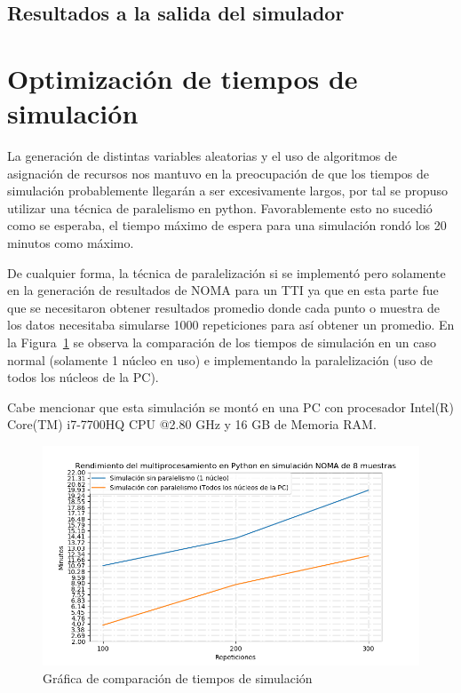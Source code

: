 \subsection{Resultados a la salida del simulador}

\hfill

\break


\section{Optimización de tiempos de simulación}

La generación de distintas variables aleatorias y el uso de algoritmos de asignación de recursos nos mantuvo en la preocupación de que los tiempos de simulación probablemente llegarán a ser excesivamente largos, por tal se propuso utilizar una técnica de paralelismo en python. Favorablemente esto no sucedió como se esperaba, el tiempo máximo de espera para una simulación rondó los 20 minutos como máximo.\newline

De cualquier forma, la técnica de paralelización si se implementó pero solamente en la generación de resultados de NOMA para un TTI ya que en esta parte fue que se necesitaron obtener resultados promedio donde cada punto o muestra de los datos necesitaba simularse 1000 repeticiones para así obtener un promedio. En la Figura~\ref{fig:SIMmultiprocessing} se observa la comparación de los tiempos de simulación en un caso normal (solamente 1 núcleo en uso) e implementando la paralelización (uso de todos los núcleos de la PC).\newline

Cabe mencionar que esta simulación se montó en una PC con procesador Intel(R) Core(TM) i7-7700HQ CPU @2.80 GHz y 16 GB de Memoria RAM.

\begin{figure}[th]
    \centering
    \includegraphics[scale=.7]{Figures/MultiprocesamientoSIM.png}
    \decoRule
    \caption[Gráfica de comparación de tiempos de simulación]{Gráfica de comparación de tiempos de simulación}
    \label{fig:SIMmultiprocessing}
\end{figure}